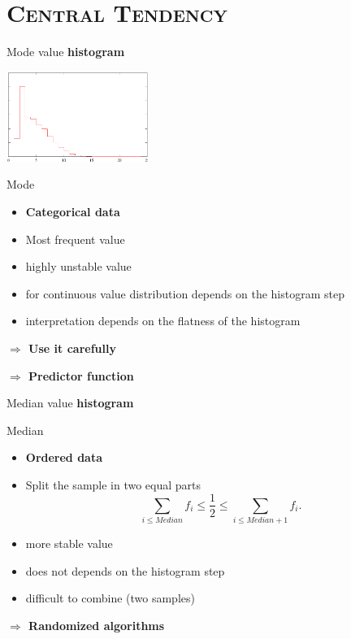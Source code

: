 \documentclass[xcolor=x11names,compress,8pt,
handout
]{beamer}
\def\leq{\leqslant}
\renewcommand{\(}{\begin{columns}}
\renewcommand{\)}{\end{columns}}
\newcommand{\<}[1]{\begin{column}{#1}}
\renewcommand{\>}{\end{column}}
\begin{document}
\section[{\scshape Central Tendency}]{{\scshape Central Tendency}}
\begin{frame}{Mode value}
{\bf histogram}
\begin{center}
\includegraphics[width=4.6cm]{histogramme.pdf}
\end{center}
\begin{block}{Mode}
\begin{itemize}
\item  {\textcolor{Green4}{\bf Categorical data}}
\item Most frequent value
\item highly unstable value
\item for continuous value distribution depends on the histogram step
\item interpretation depends on the flatness of the histogram
\end{itemize}
\alert{\bf $\Longrightarrow$ Use it carefully} 

\alert{\bf $\Longrightarrow$ Predictor function} 

\end{block}
\end{frame}
\begin{frame}{Median value}
{\bf histogram}
\begin{center}
\end{center}
\begin{block}{Median}
\begin{itemize}
\item {\textcolor{Green4}{\bf Ordered data}}
\item Split the sample in two equal parts 
\[
\sum_{i\leq Median}f_i \leq \frac 1 2 \leq \sum_{i\leq Median+1}f_i .\]
\item more stable value
\item does not depends on the histogram step 
\item difficult to combine (two samples)
\end{itemize}


\alert{\bf $\Longrightarrow$ Randomized algorithms} 

\end{block}
\end{frame}
\end{document}
